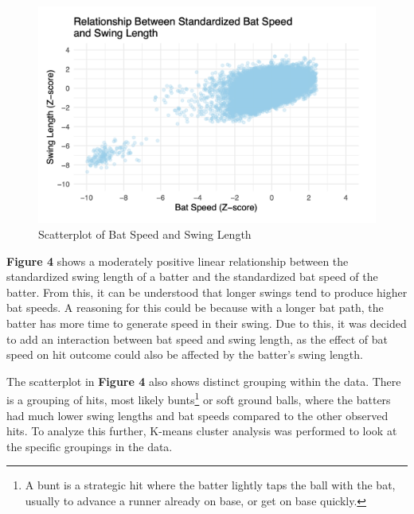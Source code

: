 \documentclass[
  letterpaper,
  DIV=11,
  numbers=noendperiod]{scrartcl}
\begin{document}
\begin{figure}[H]

{\centering \includegraphics{./images/figures/fig4.png}

}

\caption{Scatterplot of Bat Speed and Swing Length}

\end{figure}%

\textbf{Figure 4} shows a moderately positive linear relationship
between the standardized swing length of a batter and the standardized
bat speed of the batter. From this, it can be understood that longer
swings tend to produce higher bat speeds. A reasoning for this could be
because with a longer bat path, the batter has more time to generate
speed in their swing. Due to this, it was decided to add an interaction
between bat speed and swing length, as the effect of bat speed on hit
outcome could also be affected by the batter's swing length.

The scatterplot in \textbf{Figure 4} also shows distinct grouping within
the data. There is a grouping of hits, most likely bunts\footnote{A bunt
  is a strategic hit where the batter lightly taps the ball with the
  bat, usually to advance a runner already on base, or get on base
  quickly.} or soft ground balls, where the batters had much lower swing
lengths and bat speeds compared to the other observed hits. To analyze
this further, K-means cluster analysis was performed to look at the
specific groupings in the data.
\end{document}
